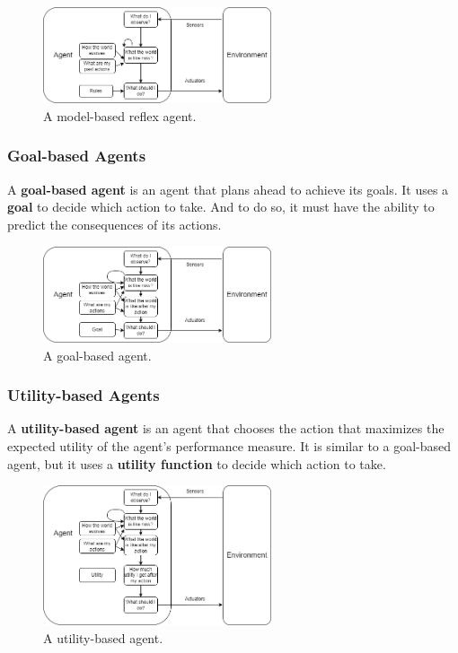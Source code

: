 \documentclass[a4paper,12pt]{article}
\begin{document}
\begin{figure}[H]
  \centering
  \includegraphics[width=0.6\textwidth]{figure/model based reflex.drawio.png}
  \caption{A model-based reflex agent.}
\end{figure}

\subsubsection{Goal-based Agents}

A \textbf{goal-based agent} is an agent that plans ahead to achieve its goals. It uses a \textbf{goal} to decide which action to take. And to do so, it must have the ability to predict the consequences of its actions.

\begin{figure}[H]
  \centering
  \includegraphics[width=0.6\textwidth]{figure/goal based.drawio.png}
  \caption{A goal-based agent.}
\end{figure}

\subsubsection{Utility-based Agents}

A \textbf{utility-based agent} is an agent that chooses the action that maximizes the expected utility of the agent's performance measure. It is similar to a goal-based agent, but it uses a \textbf{utility function} to decide which action to take.

\begin{figure}[H]
  \centering
  \includegraphics[width=0.6\textwidth]{figure/utility based.drawio.png}
  \caption{A utility-based agent.}
\end{figure}
\end{document}
